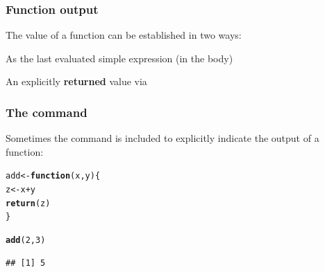 \documentclass[12pt]{beamer}\usepackage[]{graphicx}\usepackage[]{color}
\makeatletter
\newcommand{\hlnum}[1]{\textcolor[rgb]{0.686,0.059,0.569}{#1}}%
\newcommand{\hlopt}[1]{\textcolor[rgb]{0,0,0}{#1}}%
\newcommand{\hlstd}[1]{\textcolor[rgb]{0.345,0.345,0.345}{#1}}%
\newcommand{\hlkwa}[1]{\textcolor[rgb]{0.161,0.373,0.58}{\textbf{#1}}}%
\newcommand{\hlkwb}[1]{\textcolor[rgb]{0.69,0.353,0.396}{#1}}%
\newcommand{\hlkwc}[1]{\textcolor[rgb]{0.333,0.667,0.333}{#1}}%
\newcommand{\hlkwd}[1]{\textcolor[rgb]{0.737,0.353,0.396}{\textbf{#1}}}%
\newenvironment{kframe}{%
 \def\at@end@of@kframe{}%
 \ifinner\ifhmode%
  \def\at@end@of@kframe{\end{minipage}}%
  \begin{minipage}{\columnwidth}%
 \fi\fi%
 \def\FrameCommand##1{\hskip\@totalleftmargin \hskip-\fboxsep
 \colorbox{shadecolor}{##1}\hskip-\fboxsep
     \hskip-\linewidth \hskip-\@totalleftmargin \hskip\columnwidth}%
 \MakeFramed {\advance\hsize-\width
   \@totalleftmargin\z@ \linewidth\hsize
   \@setminipage}}%
 {\par\unskip\endMakeFramed%
 \at@end@of@kframe}
\newenvironment{knitrout}{}{} %
\makeatother
\begin{document}
\begin{frame}
\frametitle{Function output}

The value of a function can be established in two ways:
\bi
  \item As the last evaluated simple expression (in the body)
  \item An explicitly \textbf{returned} value via {\hilit {}}
\ei

\end{frame}


\begin{frame}[fragile]
\frametitle{The  command}

Sometimes the  command is included to explicitly indicate the output of a function:

\begin{knitrout}\footnotesize
{}\color{fgcolor}\begin{kframe}
\begin{alltt}
\hlstd{add} \hlkwb{<-} \hlkwa{function}\hlstd{(}\hlkwc{x}\hlstd{,} \hlkwc{y}\hlstd{) \{}
  \hlstd{z} \hlkwb{<-} \hlstd{x} \hlopt{+} \hlstd{y}
  \hlkwd{return}\hlstd{(z)}
\hlstd{\}}

\hlkwd{add}\hlstd{(}\hlnum{2}\hlstd{,} \hlnum{3}\hlstd{)}
\end{alltt}
\begin{verbatim}
## [1] 5
\end{verbatim}
\end{kframe}
\end{knitrout}

\end{frame}

\end{document}

